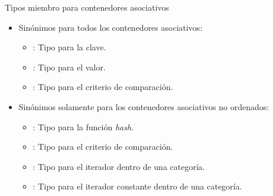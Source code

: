 \begin{frame}[t]{Tipos miembro para contenedores asociativos}
\begin{itemize}
  \item Sinónimos para todos los contenedores asociativos:
    \begin{itemize}
      \item {}: Tipo para la clave.
      \item {}: Tipo para el valor.
      \item {}: Tipo para el criterio de comparación.
    \end{itemize}
  \vfill\pause
  \item Sinónimos solamente para los contenedores asociativos no ordenados:
    \begin{itemize}
      \item {}: Tipo para la función \emph{hash}.
      \item {}: Tipo para el criterio de comparación.
      \item {}: Tipo para el iterador dentro de una categoría.
      \item {}: Tipo para el iterador constante dentro de una categoría.
    \end{itemize}
\end{itemize}
\end{frame}
